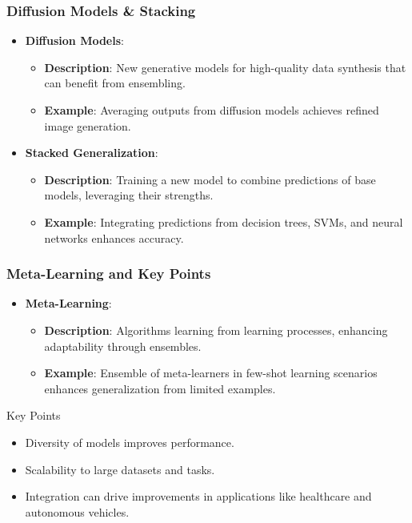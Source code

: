 \documentclass[aspectratio=169]{beamer}
\begin{document}
\begin{frame}[fragile]
    \frametitle{Diffusion Models & Stacking}
    \begin{itemize}
        \item \textbf{Diffusion Models}:
        \begin{itemize}
            \item \textbf{Description}: New generative models for high-quality data synthesis that can benefit from ensembling.
            \item \textbf{Example}: Averaging outputs from diffusion models achieves refined image generation.
        \end{itemize}
        \item \textbf{Stacked Generalization}:
        \begin{itemize}
            \item \textbf{Description}: Training a new model to combine predictions of base models, leveraging their strengths.
            \item \textbf{Example}: Integrating predictions from decision trees, SVMs, and neural networks enhances accuracy.
        \end{itemize}
    \end{itemize}
\end{frame}

\begin{frame}[fragile]
    \frametitle{Meta-Learning and Key Points}
    \begin{itemize}
        \item \textbf{Meta-Learning}:
        \begin{itemize}
            \item \textbf{Description}: Algorithms learning from learning processes, enhancing adaptability through ensembles.
            \item \textbf{Example}: Ensemble of meta-learners in few-shot learning scenarios enhances generalization from limited examples.
        \end{itemize}
    \end{itemize}
    \begin{block}{Key Points}
        \begin{itemize}
            \item Diversity of models improves performance.
            \item Scalability to large datasets and tasks.
            \item Integration can drive improvements in applications like healthcare and autonomous vehicles.
        \end{itemize}
    \end{block}
\end{frame}
\end{document}
